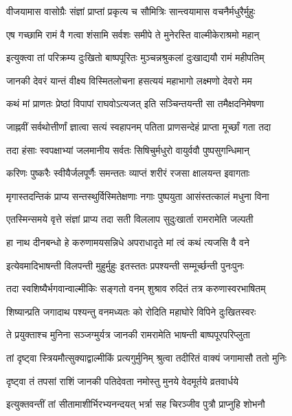 \twolineshloka
{वीजयामास वासोग्रैः संज्ञां प्राप्तां प्रकृत्य च}
{सौमित्रिः सान्त्वयामास वचनैर्मधुरैर्मुहुः}%


\twolineshloka
{एष गच्छामि रामं वै गत्वा शंसामि सर्वशः}
{समीपे ते मुनेरस्ति वाल्मीकेराश्रमो महान्}%

\twolineshloka
{इत्युक्त्वा तां परिक्रम्य दुःखितो बाष्पपूरितः}
{मुञ्चन्नश्रुकलां दुःखाद्ययौ रामं महीपतिम्}%

\twolineshloka
{जानकी देवरं यान्तं वीक्ष्य विस्मितलोचना}
{हसत्ययं महाभागो लक्ष्मणो देवरो मम}%

\twolineshloka
{कथं मां प्राणतः प्रेष्ठां विपापां राघवोऽत्यजत्}
{इति सञ्चिन्तयन्ती सा तमैक्षदनिमेषणा}%

\twolineshloka
{जाह्नवीं सर्वथोत्तीर्णां ज्ञात्वा सत्यं स्वहापनम्}
{पतिता प्राणसन्देहं प्राप्ता मूर्च्छां गता तदा}%

\twolineshloka
{तदा हंसाः स्वपक्षाभ्यां जलमानीय सर्वतः}
{सिषिचुर्मधुरो वायुर्ववौ पुष्पसुगन्धिमान्}%

\twolineshloka
{करिणः पुष्करैः स्वीयैर्जलपूर्णैः समन्ततः}
{व्याप्तं शरीरं रजसा क्षालयन्त इवागताः}%

\twolineshloka
{मृगास्तदन्तिकं प्राप्य सन्तस्थुर्विस्मितेक्षणाः}
{नगाः पुष्पयुता आसंस्तत्कालं मधुना विना}%

\twolineshloka
{एतस्मिन्समये वृत्ते संज्ञां प्राप्य तदा सती}
{विललाप सुदुःखार्ता रामरामेति जल्पती}%

\twolineshloka
{हा नाथ दीनबन्धो हे करुणामयसन्निधे}
{अपराधादृते मां त्वं कथं त्यजसि वै वने}%

\twolineshloka
{इत्येवमादिभाषन्ती विलपन्ती मुहुर्मुहुः}
{इतस्ततः प्रपश्यन्ती सम्मूर्च्छन्ती पुनःपुनः}%

\twolineshloka
{तदा स्वशिष्यैर्भगवान्वाल्मीकिः सङ्गतो वनम्}
{शुश्राव रुदितं तत्र करुणास्वरभाषितम्}%

\twolineshloka
{शिष्यान्प्रति जगादाथ पश्यन्तु वनमध्यतः}
{को रोदिति महाघोरे विपिने दुःखितस्वरः}%

\twolineshloka
{ते प्रयुक्ताश्च मुनिना सञ्जग्मुर्यत्र जानकी}
{रामरामेति भाषन्ती बाष्पपूरपरिप्लुता}%

\twolineshloka
{तां दृष्ट्वा स्त्रियमौत्सुक्याद्वाल्मीकिं प्रत्यगुर्मुनिम्}
{श्रुत्वा तदीरितं वाक्यं जगामासौ ततो मुनिः}%

\twolineshloka
{दृष्ट्वा तं तपसां राशिं जानकी पतिदेवता}
{नमोस्तु मुनये वेदमूर्तये व्रतवार्धये}%

\twolineshloka
{इत्युक्तवन्तीं तां सीतामाशीर्भिरभ्यनन्दयत्}
{भर्त्रा सह चिरञ्जीव पुत्रौ प्राप्नुहि शोभनौ}%

